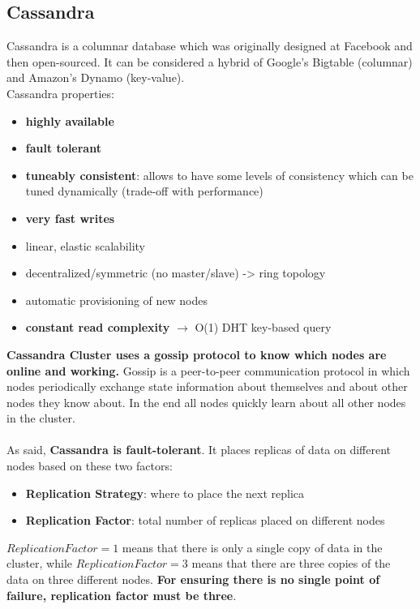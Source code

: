 \documentclass[10pt,a4paper]{article}
\newcommand{\nline}{\\~\\}
\begin{document}
\subsection{Cassandra}
Cassandra is a columnar database which was originally designed at Facebook and then open-sourced. It can be considered a hybrid of Google’s Bigtable (columnar) and Amazon’s Dynamo (key-value). \\
Cassandra properties:
\begin{itemize}
	\item \textbf{highly available}
	\item \textbf{fault tolerant}
	\item \textbf{tuneably consistent}: allows to have some levels of consistency which can be tuned dynamically (trade-off with performance)
	\item \textbf{very fast writes}
	\item linear, elastic scalability
	\item decentralized/symmetric (no master/slave) -> ring topology
	\item automatic provisioning of new nodes 
	\item \textbf{constant read complexity} $\rightarrow$ O(1) DHT key-based query
\end{itemize}
\textbf{Cassandra Cluster uses a gossip protocol to know which nodes are online and working.} Gossip is a peer-to-peer communication protocol in which nodes periodically exchange state information about themselves and about other nodes they know about. In the end all nodes quickly learn about all other nodes in the cluster.
\nline
As said, \textbf{Cassandra is fault-tolerant}. It places replicas of data on different nodes based on these two factors:
\begin{itemize}
	\item \textbf{Replication Strategy}: where to place the next replica
	\item \textbf{Replication Factor}: total number of replicas placed on different nodes
\end{itemize}
$ReplicationFactor = 1$ means that there is only a single copy of data in the cluster, while $ReplicationFactor = 3$ means that there are three copies of the data on three different nodes. \textbf{For ensuring there is no single point of failure, replication factor must be three}. 
\end{document}
